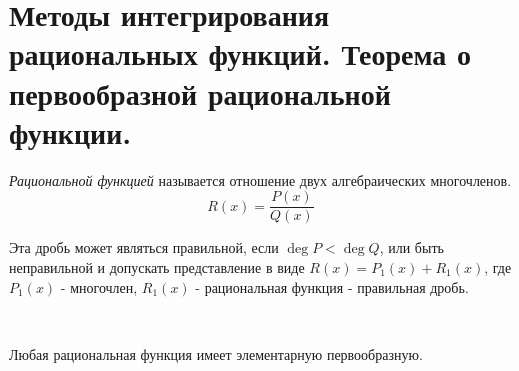 \documentclass[../main.tex]{subfiles}
\begin{document}
\newpage
\section{Методы интегрирования рациональных функций. Теорема о первообразной рациональной функции.}
\emph{Рациональной функцией} называется отношение двух алгебраических многочленов. 
\[ R\left( x\right)= \dfrac{ P\left(x\right)}{ Q\left( x\right)}\]

Эта дробь может являться правильной, если \( \deg P < \deg Q\), или быть неправильной и допускать представление в виде \( R\left( x\right)=P_1\left( x\right)+R_1\left( x\right) \), где \( P_1\left( x\right)\) - многочлен, \( R_1\left( x\right)\) - рациональная функция - правильная дробь.

\begin{thm}
    
    ~

    Любая рациональная функция имеет элементарную первообразную. 
\end{thm}
\end{document}
